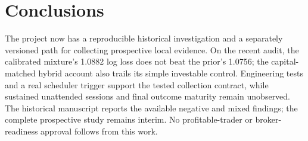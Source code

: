 \section{Conclusions}\label{sec:section-12}

The project now has a reproducible historical investigation and a separately versioned path for collecting prospective local evidence. On the recent audit, the calibrated mixture's 1.0882 log loss does not beat the prior's 1.0756; the capital-matched hybrid account also trails its simple investable control. Engineering tests and a real scheduler trigger support the tested collection contract, while sustained unattended sessions and final outcome maturity remain unobserved. The historical manuscript reports the available negative and mixed findings; the complete prospective study remains interim. No profitable-trader or broker-readiness approval follows from this work.

